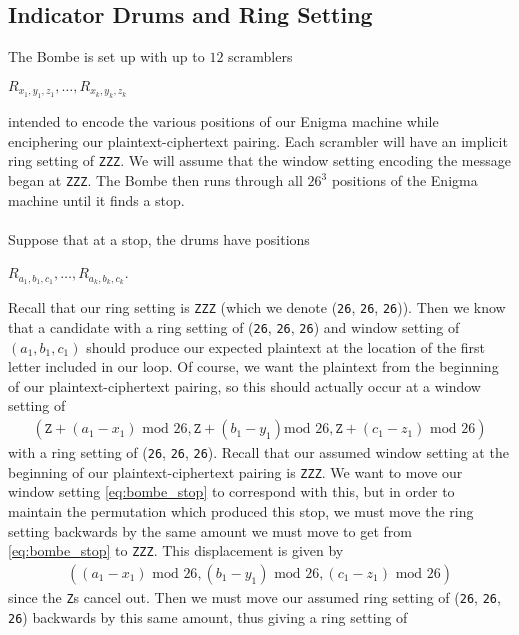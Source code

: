 \subsection{Indicator Drums and Ring Setting}
The Bombe is set up with up to $12$ scramblers
\begin{center}
  $R_{x_1, y_1, z_1},\dots, R_{x_{k}, y_{k}, z_{k}}$
\end{center}
intended to encode the various positions of our Enigma machine while
enciphering our plaintext-ciphertext pairing. Each scrambler will have an implicit ring setting of \texttt{ZZZ}. We will assume that the window setting encoding the message began at \texttt{ZZZ}. The Bombe then
runs through all $26^3$ positions of the Enigma machine until it finds
a stop. 
\\\\Suppose that at a stop, the drums have positions
\begin{center}
  $R_{a_1, b_1, c_1},\dots, R_{a_{k}, b_k, c_{k}}$.
\end{center}
Recall that our ring setting is \texttt{ZZZ} (which we denote
  (\texttt{26},
\texttt{26}, \texttt{26})). Then we know that a candidate with a ring
setting of (\texttt{26},
\texttt{26}, \texttt{26}) and window setting of $(a_1, b_1, c_1)$ should produce our expected plaintext at the location of the
first letter included in our loop. Of course, we want the plaintext
from the beginning of our plaintext-ciphertext pairing, so this
should actually occur at a window setting of
\begin{align}
  \label{eq:bombe_stop}
  (\texttt{Z} + (a_1-x_1)\text{ mod }26, \texttt{Z} + (b_1-y_1)\text{
  mod }26, \texttt{Z} + (c_1-z_1)\text{ mod }26)
\end{align}
with a ring setting of (\texttt{26},
\texttt{26}, \texttt{26}). Recall that our assumed window setting at
the beginning of our plaintext-ciphertext pairing is \texttt{ZZZ}. We
want to move our window setting \ref{eq:bombe_stop} to correspond
with this, but in order to maintain the permutation which produced this
stop, we must move the ring setting backwards by the same amount we must move to get from \ref{eq:bombe_stop} to \texttt{ZZZ}. This displacement
is given by
\begin{align*}
  ((a_1-x_1)\text{ mod }26, (b_1-y_1)\text{ mod }26, (c_1-z_1)\text{ mod }26)
\end{align*}
since the \texttt{Z}s cancel out. Then we must move our assumed ring
setting of (\texttt{26},
\texttt{26}, \texttt{26}) backwards by this same amount, thus giving a ring setting of

